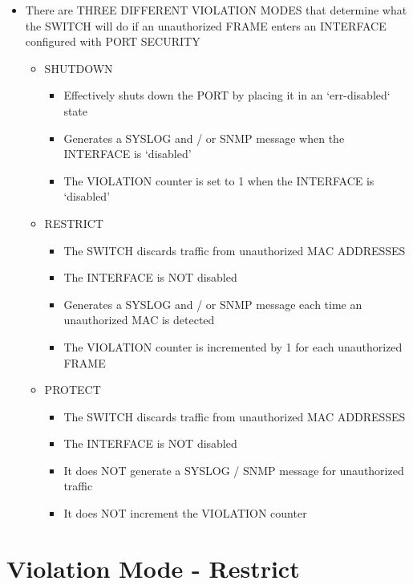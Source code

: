 \begin{itemize}
\tightlist
\item
  There are THREE DIFFERENT VIOLATION MODES that determine what the
  SWITCH will do if an unauthorized FRAME enters an INTERFACE configured
  with PORT SECURITY

  \begin{itemize}
  \tightlist
  \item
    SHUTDOWN

    \begin{itemize}
    \tightlist
    \item
      Effectively shuts down the PORT by placing it in an `err-disabled`
      state
    \item
      Generates a SYSLOG and / or SNMP message when the INTERFACE is
      `disabled'
    \item
      The VIOLATION counter is set to 1 when the INTERFACE is `disabled'
    \end{itemize}
  \item
    RESTRICT

    \begin{itemize}
    \tightlist
    \item
      The SWITCH discards traffic from unauthorized MAC ADDRESSES
    \item
      The INTERFACE is NOT disabled
    \item
      Generates a SYSLOG and / or SNMP message each time an unauthorized
      MAC is detected
    \item
      The VIOLATION counter is incremented by 1 for each unauthorized
      FRAME
    \end{itemize}
  \item
    PROTECT

    \begin{itemize}
    \tightlist
    \item
      The SWITCH discards traffic from unauthorized MAC ADDRESSES
    \item
      The INTERFACE is NOT disabled
    \item
      It does NOT generate a SYSLOG / SNMP message for unauthorized
      traffic
    \item
      It does NOT increment the VIOLATION counter
    \end{itemize}
  \end{itemize}
\end{itemize}

\section{Violation Mode - Restrict}\label{violation-mode---restrict}


